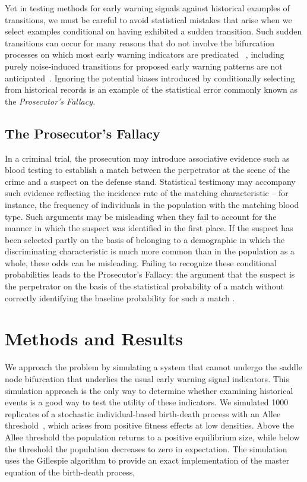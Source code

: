 \documentclass[authoryear,review,12pt]{elsarticle}
\begin{document}
Yet in testing methods for early warning signals against historical examples of
transitions, we must be careful to avoid statistical mistakes that arise when
we select examples conditional on having exhibited a sudden transition.  Such
sudden transitions can occur for many reasons that do not involve the 
bifurcation processes on which most early warning indicators are predicated
~\citep{Hastings2010}, including purely noise-induced transitions for proposed 
early warning patterns are not anticipated~\citep{Ditlevsen2010, Lenton2011}. 
Ignoring the potential biases introduced by conditionally selecting from 
historical records is an example of the statistical error commonly known as the
\emph{Prosecutor's Fallacy.}

\subsection*{The Prosecutor's Fallacy}


In a criminal trial, the prosecution may introduce associative evidence such as 
blood testing to establish a match between the perpetrator at the scene of the
crime and a suspect on the defense stand.  Statistical testimony may accompany 
such evidence reflecting the incidence rate of the matching characteristic -- 
for instance, the frequency of individuals in the population with the matching
blood type.  Such arguments may be misleading when they fail to account for  
the manner in which the suspect was identified in 
the first place.  If the suspect has been selected partly on the basis of 
belonging to a demographic in which the discriminating characteristic is much more common than
in the population as a whole, these odds can be misleading.  Failing to recognize 
these conditional probabilities leads to the Prosecutor's Fallacy: the 
argument that the suspect is the perpetrator on the basis of the statistical 
probability of a match without correctly identifying the baseline probability 
for such a match \citep{Thompson1987}.


\section{Methods and Results}
We approach the problem by simulating a system that cannot undergo the saddle
node bifurcation that underlies the usual early warning signal indicators.  
This simulation approach is the only way to determine whether examining 
historical events is a good way to test the utility of these indicators.
We simulated 1000 replicates of a stochastic individual-based birth-death process
with an Allee threshold~\citep{Courchamp2008}, which arises from positive fitness
effects at low densities.  Above the Allee threshold the population returns
to a positive equilibrium size, while below the threshold the population decreases
to zero in expectation. The simulation uses the Gillespie algorithm to provide an exact 
implementation of the master equation of the birth-death process,
\end{document}
